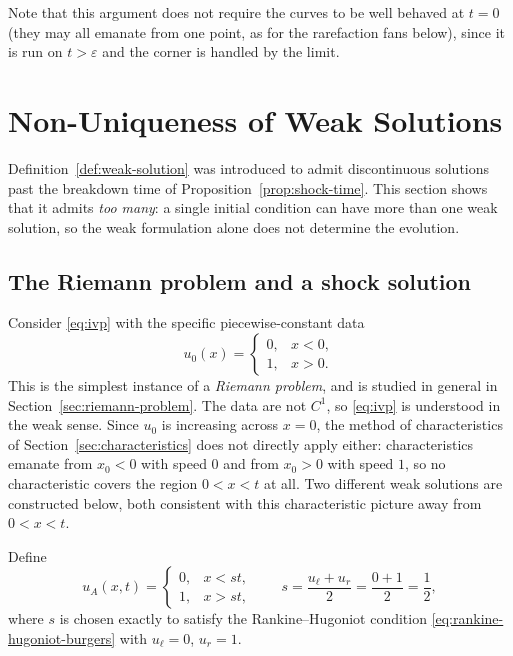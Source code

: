 Note that this argument does not require the curves to be well behaved
at $t=0$ (they may all emanate from one point, as for the rarefaction
fans below), since it is run on $t>\varepsilon$ and the corner is handled
by the limit.


\section{Non-Uniqueness of Weak Solutions}
\label{sec:nonuniqueness}

Definition~\ref{def:weak-solution} was introduced to admit discontinuous
solutions past the breakdown time of Proposition~\ref{prop:shock-time}.
This section shows that it admits \emph{too many}: a single initial
condition can have more than one weak solution, so the weak formulation
alone does not determine the evolution.

\subsection{The Riemann problem and a shock solution}
\label{subsec:nonuniq-setup}

Consider \eqref{eq:ivp} with the specific piecewise-constant data
\begin{equation}
  \label{eq:riemann-data}
  u_0(x) = \begin{cases} 0, & x < 0, \\ 1, & x > 0. \end{cases}
\end{equation}
This is the simplest instance of a \emph{Riemann problem}, and is studied
in general in Section~\ref{sec:riemann-problem}. The data are not $C^1$,
so \eqref{eq:ivp} is understood in the weak sense. Since $u_0$ is
increasing across $x=0$, the method of characteristics of
Section~\ref{sec:characteristics} does not directly apply either:
characteristics emanate from $x_0<0$ with speed $0$ and from $x_0>0$ with
speed $1$, so no characteristic covers the region $0<x<t$ at all. Two
different weak solutions are constructed below, both consistent with this
characteristic picture away from $0<x<t$.

Define
\begin{equation}
  \label{eq:shock-solution}
  u_A(x,t) = \begin{cases} 0, & x < st, \\ 1, & x > st, \end{cases}
  \qquad s = \frac{u_\ell+u_r}{2} = \frac{0+1}{2} = \frac12,
\end{equation}
where $s$ is chosen exactly to satisfy the Rankine--Hugoniot condition
\eqref{eq:rankine-hugoniot-burgers} with $u_\ell=0$, $u_r=1$.


